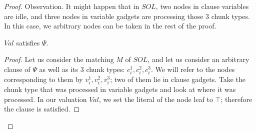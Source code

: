 \documentclass[9pt,twocolumn]{scrartcl}
\newcommand{\achunk}{\ensuremath{c}}
\newcommand{\Formula}{\ensuremath{\Psi}}
\newcommand{\Val}{\ensuremath{Val}}
\newcommand{\Sol}{\ensuremath{SOL}}
\begin{document}
\begin{appendix}
\begin{proof}
Observation. It might happen that in $\Sol$, two nodes in
clause variables are idle, and three nodes in variable gadgets are
processing those $3$ chunk types. In this case, we
arbitrary nodes can be taken in the rest
of the proof.

\begin{lemma}
$\Val$ satisfies $\Formula$.
\end{lemma}
\begin{proof}
Let us consider the matching $M$ of $\Sol$, and let us consider an arbitrary clause of
$\Formula$ as well as its $3$ chunk types: $\achunk_i^1, \achunk_i^2, \achunk_i^3$.
We will refer to the nodes corresponding to them
by $v_i^1, v_i^2, v_i^3$; two of them lie in clause gadgets.
Take the chunk type that was processed in variable
gadgets and look at where it was processed.
In our valuation $\Val$, we set the literal of the node leaf to
$\top$; therefore the clause is satisfied.
\end{proof}
\end{proof}

\end{appendix}
\end{document}
